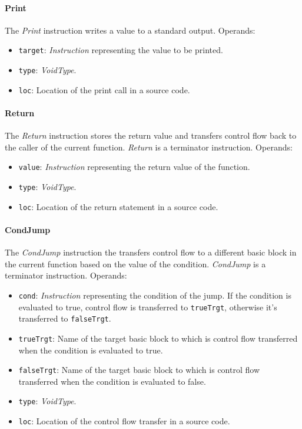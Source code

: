 \documentclass[thesis=M,english]{FITthesis}[2019/12/23]
\begin{document}
\paragraph*{Print} The \emph{Print} instruction writes a value to a standard output. Operands:
\begin{itemize}
    \item \texttt{target}: \emph{Instruction} representing the value to be printed.
    \item \texttt{type}: \emph{VoidType}.
    \item \texttt{loc}: Location of the print call in a source code.
\end{itemize}

\paragraph*{Return} The \emph{Return} instruction stores the return value and transfers control flow back to the caller of the current function. \emph{Return} is a terminator instruction. Operands:
\begin{itemize}
    \item \texttt{value}: \emph{Instruction} representing the return value of the function.
    \item \texttt{type}: \emph{VoidType}.
    \item \texttt{loc}: Location of the return statement in a source code.
\end{itemize}

\paragraph*{CondJump} The \emph{CondJump} instruction the transfers control flow to a different basic block in the current function based on the value of the condition. \emph{CondJump} is a terminator instruction. Operands:
\begin{itemize}
    \item \texttt{cond}: \emph{Instruction} representing the condition of the jump. If the condition is evaluated to true, control flow is transferred to \texttt{trueTrgt}, otherwise it's transferred to \texttt{falseTrgt}.
    \item \texttt{trueTrgt}: Name of the target basic block to which is control flow transferred when the condition is evaluated to true.
    \item \texttt{falseTrgt}: Name of the target basic block to which is control flow transferred when the condition is evaluated to false.
    \item \texttt{type}: \emph{VoidType}.
    \item \texttt{loc}: Location of the control flow transfer in a source code.
\end{itemize}
\end{document}
